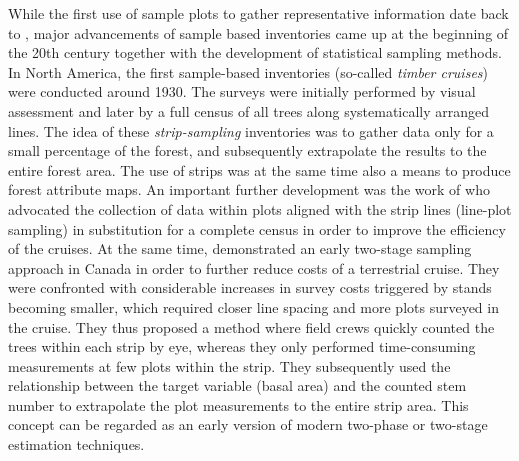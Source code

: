 While the first use of sample plots to gather representative information date back to \citet{hartig1795}, major advancements of sample based inventories came up at the beginning of the 20th century together with the development of statistical sampling methods. In North America, the first sample-based inventories (so-called \textit{timber cruises}) were conducted around 1930. The surveys were initially performed by visual assessment and later by a full census of all trees along systematically arranged lines. The idea of these \textit{strip-sampling} inventories was to gather data only for a small percentage of the forest, and subsequently extrapolate the results to the entire forest area. The use of strips was at the same time also a means to produce forest attribute maps. An important further development was the work of \citet{goodspeed1934} who advocated the collection of data within plots aligned with the strip lines (line-plot sampling) in substitution for a complete census in order to improve the efficiency of the cruises.  At the same time, \citet{langballe1938} demonstrated an early two-stage sampling approach in Canada in order to further reduce costs of a terrestrial cruise. They were confronted with considerable increases in survey costs triggered by stands becoming smaller, which required closer line spacing and more plots surveyed in the cruise. They thus proposed a method where field crews quickly counted the trees within each strip by eye, whereas they only performed time-consuming measurements at few plots within the strip. They subsequently used the relationship between the target variable (basal area) and the counted stem number to extrapolate the plot measurements to the entire strip area. This concept can be regarded as an early version of modern two-phase or two-stage estimation techniques.\par

